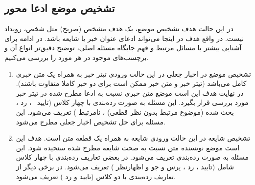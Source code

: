 \subsection[تشخیص موضع ادعا محور]{تشخیص موضع ادعا محور
}
در این حالت هدف تشخیص موضع، یک هدف مشخص (صریح) مثل شخص، رویداد نیست. در واقع هدف
در اینجا می‌تواند ادعای عنوان خبر یا شایعه باشد. در ادامه برای آشنایی بیشتر با مسائل مرتبط و فهم جایگاه مسئله اصلی، توضیح دقیق‌تر انواع آن و برچسب‌های موجود در هر مورد را بررسی می‌کنیم.
\begin{enumerate}
	\item  
	تشخیص موضع در اخبار جعلی
	\newline
	در این حالت ورودی تیتر خبر
	به همراه یک متن خبری کامل
	می‌باشد (تیتر خبر و متن خبر ممکن است برای دو خبر کاملا متفاوت باشند). در نهایت هدف این است موضع متن خبری نسبت به ادعا مطرح شده در تیتر خبر مورد بررسی قرار بگیرد. این مسئله به صورت ردە‌بندی با‌ چهار کلاس (تایید‍~
			، رد
	، بحث شده (موضوع مرتبط بدون نظر قطعی)
	، نامرتبط
	) تعریف می‌‌شود. این مسئله برای حل تشخیص اخبار جعلی مطرح می‌شود.
	\item 
	تشخیص شایعه
	\newline
	در این حالت ورودی شایعه به همراه یک قطعه متن است. هدف این است موضع نویسنده متن نسبت به صحت شایعه مطرح شده سنجیده شود. این مسئله به صورت ردە‌بندی تعریف می‌شود. در بعضی تعاریف ردە‌بندی با چهار کلاس شامل (تایید
	، رد
	، پرس و جو
	 و اظهارنظر
	 ) تعریف می‌شود. در برخی دیگر از تعاریف ردە‌بندی با دو کلاس (تایید
	 و رد
	 ) تعریف می‌شود.
\end{enumerate}
